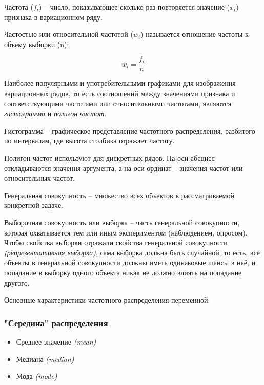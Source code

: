 Частота (\colorbox[rgb]{0.95, 0.95, 0.95}{$f_i$}) -- число, показывающее сколько раз повторяется значение (\colorbox[rgb]{0.95, 0.95, 0.95}{$x_i$}) признака в вариационном ряду.

Частостью или относительной частотой (\colorbox[rgb]{0.95, 0.95, 0.95}{$w_i$}) называется отношение частоты к объему выборки (\colorbox[rgb]{0.95, 0.95, 0.95}{n}):

\begin{equation}
	w_i = \frac{f_i}{n}
\end{equation}

Наиболее популярными и употребительными графиками для изображения вариационных рядов, то есть соотношений между значениями признака и соответствующими частотами или относительными частотами, являются \textit{гистограмма} и \textit{полигон частот}.

Гистограмма -- графическое представление частотного распределения, разбитого по интервалам, где высота столбика отражает частоту.

Полигон частот используют для дискретных рядов. На оси абсцисс откладываются значения аргумента, а на оси ординат -- значения частот или относительных частот.

Генеральная совокупность -- множество всех объектов в рассматриваемой конкретной задаче.

Выборочная совокупность или выборка -- часть генеральной совокупности, которая охватывается тем или иным экспериментом (наблюдением, опросом). Чтобы свойства выборки отражали свойства генеральной совокупности \textit{(репрезентативная выборка)}, сама выборка должна быть случайной, то есть, все объекты в генеральной совокупности должны иметь одинаковые шансы в неё, и попадание в выборку одного объекта никак не должно влиять на попадание другого.

Основные характеристики частотного распределения переменной:

\subsubsection*{"Середина" \hspace*{0.1cm} распределения}

\begin{itemize}
	\item Среднее значение \textit{(mean)}
	\item Медиана \textit{(median)}
	\item Мода \textit{(mode)}
\end{itemize}

